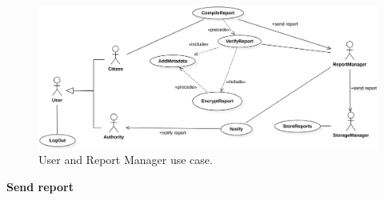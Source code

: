 \documentclass{report}
\begin{document}
\begin{figure}[ht!]
\begin{center}
\includegraphics[width=\textwidth]{./img/UseCase2.png}
\end{center}
\caption{User and Report Manager use case.}
\label{fig:UseCase2}
\end{figure}

\begin{center}
	\textbf{Send report}
\end{center}
\end{document}
